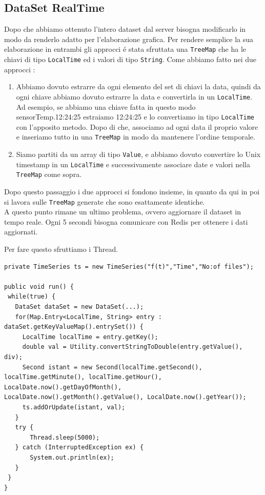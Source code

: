 \subsection{DataSet RealTime}
Dopo che abbiamo ottenuto l'intero dataset dal server bisogna modificarlo in modo da renderlo adatto per l'elaborazione grafica.
Per rendere semplice la sua elaborazione in entrambi gli approcci é stata sfruttata una \texttt{TreeMap} che ha le chiavi
di tipo \texttt{LocalTime} ed i valori di tipo \texttt{String}.
Come abbiamo fatto nei due approcci :
\begin{enumerate}
    \item Abbiamo dovuto estrarre da ogni elemento del set di chiavi la data, quindi da ogni chiave abbiamo dovuto estrarre la data e convertirla
    in un \texttt{LocalTime}.
    Ad esempio, se abbiamo una chiave fatta in questo modo sensorTemp.12:24:25 estraiamo 12:24:25 e lo convertiamo in tipo \texttt{LocalTime} con l'apposito metodo.
    Dopo di che, associamo ad ogni data il proprio valore e inseriamo tutto in una \texttt{TreeMap} in modo da mantenere l'ordine temporale.
    \item Siamo partiti da un array di tipo \texttt{Value}, e abbiamo dovuto convertire lo Unix timestamp in un \texttt{LocalTime} e successivamente associare date
    e valori nella \texttt{TreeMap} come sopra.
\end{enumerate}
Dopo questo passaggio i due approcci si fondono insieme, in quanto da qui in poi si lavora sulle \texttt{TreeMap} generate che sono esattamente identiche.\\

A questo punto rimane un ultimo problema, ovvero aggiornare il dataset in tempo reale.
Ogni 5 secondi bisogna comunicare con Redis per ottenere i dati aggiornati.

Per fare questo sfruttiamo i Thread.


\begin{lstlisting}[autogobble, title={\texttt{DataSetRealTime.java}}]
private TimeSeries ts = new TimeSeries("f(t)","Time","No:of files");

public void run() {
 while(true) {
   DataSet dataSet = new DataSet(...);
   for(Map.Entry<LocalTime, String> entry : dataSet.getKeyValueMap().entrySet()) {
     LocalTime localTime = entry.getKey();
     double val = Utility.convertStringToDouble(entry.getValue(), div);
     Second istant = new Second(localTime.getSecond(), localTime.getMinute(), localTime.getHour(), LocalDate.now().getDayOfMonth(), LocalDate.now().getMonth().getValue(), LocalDate.now().getYear());
     ts.addOrUpdate(istant, val);
   }
   try {
       Thread.sleep(5000);
   } catch (InterruptedException ex) {
       System.out.println(ex);
   }
 }
}
\end{lstlisting}

